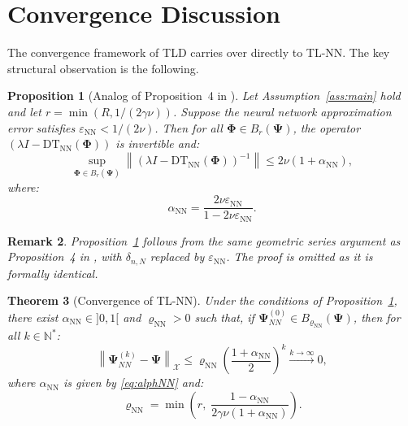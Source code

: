 \documentclass[12pt, a4paper]{article}
\newtheorem{theorem}{Theorem}[section]
\newtheorem{proposition}[theorem]{Proposition}
\newtheorem{remark}[theorem]{Remark}
\newcommand{\norm}[1]{\left\| #1 \right\|}
\newcommand{\DTNN}{\mathrm{DT}_{\mathrm{NN}}}
\newcommand{\epsNN}{\varepsilon_{\mathrm{NN}}}
\newcommand{\alphNN}{\alpha_{\mathrm{NN}}}
\newcommand{\varrhoNN}{\varrho_{\mathrm{NN}}}
\newcommand{\N}{\mathbb{N}}
\begin{document}
\section{Convergence Discussion}
\label{sec:convergence}

The convergence framework of TLD carries over directly to
TL-NN. The key structural observation is the following.

\begin{proposition}[Analog of Proposition~4 in \cite{sedka2025}]
\label{prop:invertible}
Let Assumption~\ref{ass:main} hold and let
$r = \min(R, 1/(2\gamma\nu))$.
Suppose the neural network approximation error satisfies
$\epsNN < 1/(2\nu)$.
Then for all $\boldsymbol{\Phi} \in B_r(\boldsymbol{\Psi})$,
the operator $(\lambda I - \DTNN(\boldsymbol{\Phi}))$ is
invertible and:
\begin{equation}
  \sup_{\boldsymbol{\Phi} \in B_r(\boldsymbol{\Psi})}
  \norm{(\lambda I - \DTNN(\boldsymbol{\Phi}))^{-1}}
  \leq 2\nu(1 + \alphNN),
  \label{eq:inv_bound}
\end{equation}
where:
\begin{equation}
  \alphNN = \frac{2\nu\epsNN}{1 - 2\nu\epsNN}.
  \label{eq:alphNN}
\end{equation}
\end{proposition}

\begin{remark}
  Proposition~\ref{prop:invertible} follows from the same
  geometric series argument as Proposition~4 in
  \cite{sedka2025}, with $\delta_{n,N}$ replaced by
  $\epsNN$.
  The proof is omitted as it is formally identical.
\end{remark}

\begin{theorem}[Convergence of TL-NN]
\label{thm:tlnn}
Under the conditions of Proposition~\ref{prop:invertible},
there exist $\alphNN \in {]0,1[}$ and $\varrhoNN > 0$ such
that, if $\boldsymbol{\Psi}_{NN}^{(0)} \in
B_{\varrhoNN}(\boldsymbol{\Psi})$, then for all $k \in \N^*$:
\begin{equation}
  \norm{\boldsymbol{\Psi}_{NN}^{(k)} -
  \boldsymbol{\Psi}}_\mathcal{X}
  \leq \varrhoNN
  \left(\frac{1 + \alphNN}{2}\right)^k
  \xrightarrow{k \to \infty} 0,
  \label{eq:tlnn_conv}
\end{equation}
where $\alphNN$ is given by \eqref{eq:alphNN} and:
\begin{equation}
  \varrhoNN = \min\!\left(r,\;
  \frac{1 - \alphNN}{2\gamma\nu(1 + \alphNN)}\right).
  \label{eq:varrhoNN}
\end{equation}
\end{theorem}
\end{document}
